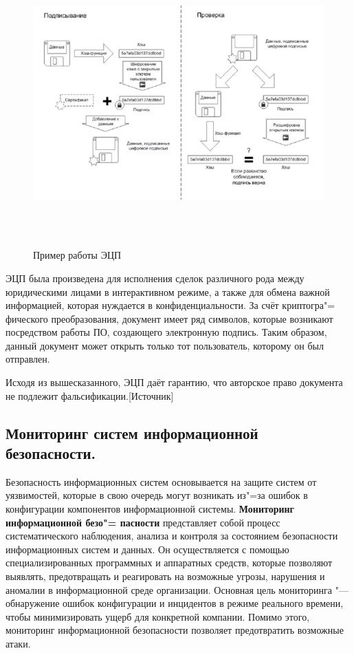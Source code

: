    \begin{figure}[H]
        \centering
        \includegraphics[height = 11cm, width = 14cm]{img/legit_doc.png}
        \caption{Пример работы ЭЦП}
    \end{figure}

    ЭЦП была произведена для исполнения сделок различного рода между юридическими лицами в интерактивном режиме,
    а также для обмена важной информацией, которая нуждается в конфиденциальности. За счёт криптогра"=
    фического преобразования,
    документ имеет ряд символов, которые возникают посредством работы ПО, создающего электронную подпись. Таким образом, данный документ
    может открыть только тот пользователь, которому он был отправлен.

    Исходя из вышесказанного, ЭЦП даёт гарантию, что авторское право документа не подлежит фальсификации.[Источник]

\newpage
\subsection{Мониторинг систем информационной безопасности.}
    Безопасность информационных систем основывается на защите систем от уязвимостей, которые в свою очередь могут возникать из"=за
    ошибок в конфигурации компонентов информационной системы. \textbf{Мониторинг информационной безо"=
    пасности} представляет собой процесс систематического 
    наблюдения, анализа и контроля за состоянием безопасности информационных систем и данных. Он осуществляется с помощью специализированных программных и 
    аппаратных средств, которые позволяют выявлять, предотвращать и реагировать на возможные угрозы, нарушения и аномалии в информационной среде организации.
    Основная цель мониторинга "--- обнаружение ошибок конфигурации и инцидентов в режиме реального времени, чтобы минимизировать ущерб для конкретной компании.
    Помимо этого, мониторинг информационной безопасности позволяет предотвратить возможные атаки.

